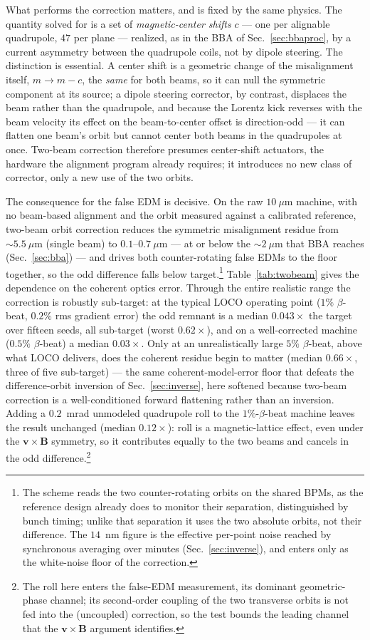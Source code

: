 \documentclass[aps,prab,reprint,superscriptaddress,nofootinbib]{revtex4-2}
\begin{document}
What performs the correction matters, and is fixed by the same physics.  The
quantity solved for is a set of \emph{magnetic-center shifts} $c$ --- one per
alignable quadrupole, $47$ per plane --- realized, as in the BBA of
Sec.~\ref{sec:bbaproc}, by a current asymmetry between the quadrupole coils, not
by dipole steering.  The distinction is essential.  A center shift is a geometric
change of the misalignment itself, $m\to m-c$, the \emph{same} for both beams, so
it can null the symmetric component at its source; a dipole steering corrector,
by contrast, displaces the beam rather than the quadrupole, and because the
Lorentz kick reverses with the beam velocity its effect on the beam-to-center
offset is direction-odd --- it can flatten one beam's orbit but cannot center
both beams in the quadrupoles at once.  Two-beam correction therefore presumes
center-shift actuators, the hardware the alignment program already requires; it
introduces no new class of corrector, only a new use of the two orbits.

The consequence for the false EDM is decisive.  On the raw $10~\mu$m machine,
with no beam-based alignment and the orbit measured against a calibrated
reference, two-beam orbit correction reduces the symmetric
misalignment residue from $\sim\!5.5~\mu$m (single beam) to $0.1$--$0.7~\mu$m
--- at or below the $\sim\!2~\mu$m that BBA reaches (Sec.~\ref{sec:bba}) --- and
drives both counter-rotating false EDMs to the floor together, so the odd
difference falls below target.\footnote{The scheme reads the two
counter-rotating orbits on the shared BPMs, as the reference design already does
to monitor their separation, distinguished by bunch timing; unlike that
separation it uses the two absolute orbits, not their difference.  The $14$~nm
figure is the effective per-point noise reached by synchronous averaging over
minutes (Sec.~\ref{sec:inverse}), and enters only as the white-noise floor of
the correction.}  Table~\ref{tab:twobeam} gives the dependence on
the coherent optics error.  Through the entire realistic range the correction
is robustly sub-target: at the typical LOCO operating point ($1\%$ $\beta$-beat,
$0.2\%$ rms gradient error) the odd remnant is a median $0.043\times$ the target
over fifteen seeds, all sub-target (worst $0.62\times$), and on a well-corrected
machine ($0.5\%$ $\beta$-beat) a median $0.03\times$.  Only at an
unrealistically large $5\%$ $\beta$-beat, above what LOCO delivers, does the
coherent residue begin to matter (median $0.66\times$, three of five
sub-target) --- the same coherent-model-error floor that defeats the
difference-orbit inversion of Sec.~\ref{sec:inverse}, here softened because
two-beam correction is a well-conditioned forward flattening rather than an
inversion.  Adding a $0.2$~mrad unmodeled quadrupole roll to the
$1\%$-$\beta$-beat machine leaves the result unchanged (median $0.12\times$):
roll is a magnetic-lattice effect, even under the $\bm v\times\bm B$ symmetry,
so it contributes equally to the two beams and cancels in the odd
difference.\footnote{The roll here enters the false-EDM measurement, its
dominant geometric-phase channel; its second-order coupling of the two
transverse orbits is not fed into the (uncoupled) correction, so the test bounds
the leading channel that the $\bm v\times\bm B$ argument identifies.}
\end{document}
